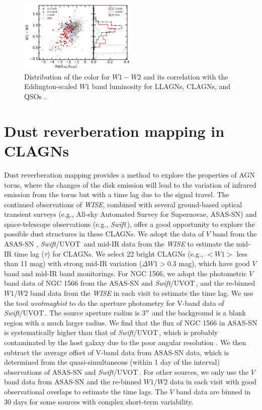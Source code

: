 \documentclass[linenumbers]{aastex631}
\newcommand{\swift}{{\small \it Swift}}
\newcommand{\uvot}{{\small {\it Swift}/UVOT}}
\begin{document}
\begin{figure}
\centering
	\includegraphics[width=0.5\textwidth]{pic/WISE_W1-W2_LW1_Ledd_hist.png}
    \caption{Distribution of the color for $W1-W2$ and its correlation with the Eddington-scaled $W1$ band luminosity for LLAGNs\citep{2009MNRAS.399..349G}, CLAGNs, and QSOs \citep{2007ApJ...667..131G}. }
    \label{fig:color_ledd}
\end{figure}




\section{Dust reverberation mapping in CLAGNs}\label{sec:tau-L}
Dust reverberation mapping provides a method to explore the properties of AGN torus, where the changes of the disk emission will lead to the variation of infrared emission from the torus but with a time lag due to the signal travel. The continued observations of {\it WISE}, combined with several ground-based optical transient surveys (e.g., All-sky Automated Survey for Supernovae, ASAS-SN) and space-telescope observations (e.g., \swift\,), offer a good opportunity to explore the possible dust structures in these CLAGNs. We adopt the data of $V$ band from the ASAS-SN \citep[][]{2014ApJ...788...48S,2017PASP..129j4502K,2019MNRAS.485..961J}, \uvot\, and mid-IR data from the {\it WISE} to estimate the mid-IR time lag ($\tau$) for CLAGNs. We select 22 bright CLAGNs (e.g., $<W1>$ less than 11 mag) with strong mid-IR variation ($\Delta W1>0.3$ mag), which have good $V$ band and mid-IR band monitorings. For NGC 1566, we adopt the photometric $V$ band data of NGC 1566 from the ASAS-SN and \uvot\,, and the re-binned $W1$/$W2$ band data from the {\it WISE} in each visit to estimate the time lag. We use the tool \textit{uvotmaghist} to do the aperture photometry for V-band data of \uvot\,. The source aperture radius is 3$\mbox{$^{\prime\prime}$}$ and the background is a blank region with a much larger radius. We find that the flux of NGC 1566 in ASAS-SN is systematically higher than that of \uvot\,, which is probably contaminated by the host galaxy due to the poor angular resolution \citep[see ][]{2017PASP..129j4502K}. We then subtract the average offset of V-band data from ASAS-SN data, which is determined from the quasi-simultaneous (within 1 day of the interval) observations of ASAS-SN and \uvot\,. For other sources, we only use the $V$ band data from ASAS-SN and the re-binned $W1$/$W2$ data in each visit with good observational overlaps to estimate the time lags. The $V$ band data are binned in 30 days for some sources with complex short-term variability.
\end{document}
